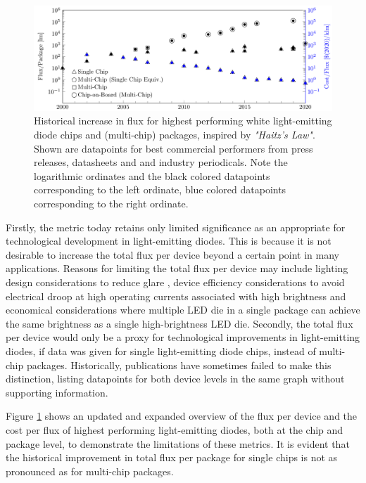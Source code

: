\documentclass[a4paper,nocompress]{spie}  %
\begin{document}
    \begin{figure} [ht]
        \begin{center}
            \includegraphics[width=\textwidth]{haitz_law_white.pdf}
        \end{center}
        \caption{Historical increase in flux for highest performing white light-emitting diode chips and (multi-chip) packages, inspired by \textit{"Haitz's Law"}\cite{haitz1999case}. Shown are datapoints for best commercial performers from press releases, datasheets and and industry periodicals. Note the logarithmic ordinates and the black colored datapoints corresponding to the left ordinate, blue colored datapoints corresponding to the right ordinate.}
        \label{fig:haitz}
    \end{figure}
    
    Firstly, the metric today retains only limited significance as an appropriate for technological development in light-emitting diodes. This is because it is not desirable to increase the total flux per device beyond a certain point in many applications. Reasons for limiting the total flux per device may include lighting design considerations to reduce glare \cite{khan2015led}, device efficiency considerations to avoid electrical droop at high operating currents associated with high brightness \cite{Piprek2010} and economical considerations where multiple LED die in a single package can achieve the same brightness as a single high-brightness LED die. Secondly, the total flux per device would only be a proxy for technological improvements in light-emitting diodes, if data was given for single light-emitting diode chips, instead of multi-chip packages. Historically, publications have sometimes failed to make this distinction, listing datapoints for both device levels in the same graph without supporting information.

    Figure \ref{fig:haitz} shows an updated and expanded overview of the flux per device and the cost per flux of highest performing light-emitting diodes, both at the chip and package level, to demonstrate the limitations of these metrics. It is evident that the historical improvement in total flux per package for single chips is not as pronounced as for multi-chip packages.
\end{document}
